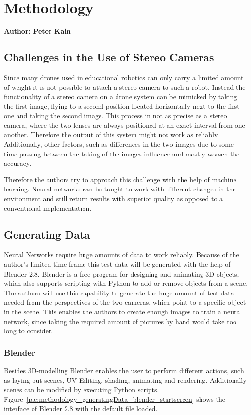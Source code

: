 \chapter{Methodology}

\textbf{Author: Peter Kain} 

\section{Challenges in the Use of Stereo Cameras}
Since many drones used in educational robotics can only carry a limited amount of weight it is not possible to attach a stereo camera to such a robot. Instead the functionality of a stereo camera on a drone system can be mimicked by taking the first image, flying to a second position located horizontally next to the first one and taking the second image. This process in not as precise as a stereo camera, where the two lenses are always positioned at an exact interval from one another. Therefore the output of this system might not work as reliably. Additionally, other factors, such as differences in the two images due to some time passing between the taking of the images influence and mostly worsen the accuracy.

Therefore the authors try to approach this challenge with the help of machine learning. Neural networks can be taught to work with different changes in the environment and still return results with superior quality as opposed to a conventional implementation.

\section{Generating Data}
Neural Networks require huge amounts of data to work reliably. Because of the author's limited time frame this test data will be generated with the help of Blender 2.8. Blender is a free program for designing and animating 3D objects, which also supports scripting with Python to add or remove objects from a scene. The authors will use this capability to generate the huge amount of test data needed from the perspectives of the two cameras, which point to a specific object in the scene. This enables the authors to create enough images to train a neural network, since taking the required amount of pictures by hand would take too long to consider. 

\newpage

\subsection{Blender}
Besides 3D-modelling Blender enables the user to perform different actions, such as laying out scenes, UV-Editing, shading, animating and rendering. Additionally scenes can be modified by executing Python scripts. Figure~\ref{pic:methodology_generatingData_blender_startscreen} shows the interface of Blender 2.8 with the default file loaded.


